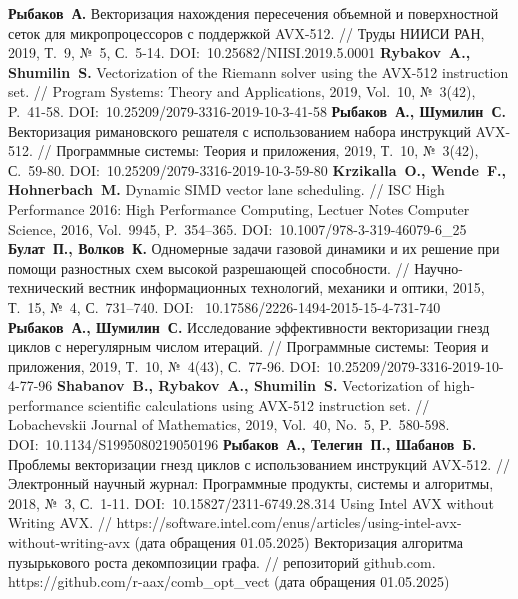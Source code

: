 \begin{thebibliography}{99}
\textbf{Рыбаков~А.} Векторизация нахождения пересечения объемной и поверхностной сеток для микропроцессоров с поддержкой AVX-512. // Труды НИИСИ РАН, 2019, Т.~9, №~5, С.~5-14. DOI:~10.25682/NIISI.2019.5.0001
\textbf{Rybakov~A., Shumilin~S.} Vectorization of the Riemann solver using the AVX-512 instruction set. // Program Systems: Theory and Applications, 2019, Vol.~10, №~3(42), P.~41-58. DOI:~10.25209/2079-3316-2019-10-3-41-58
\textbf{Рыбаков~А., Шумилин~С.} Векторизация римановского решателя с использованием набора инструкций AVX-512. // Программные системы: Теория и приложения, 2019, Т.~10, №~3(42), С.~59-80. DOI:~10.25209/2079-3316-2019-10-3-59-80
\textbf{Krzikalla~O., Wende~F., Hohnerbach~M.} Dynamic SIMD vector lane scheduling. // ISC High Performance 2016: High Performance Computing, Lectuer Notes Computer Science, 2016, Vol.~9945, P.~354–365. DOI:~10.1007/978-3-319-46079-6\_25
\textbf{Булат~П., Волков~К.} Одномерные задачи газовой динамики и их решение при помощи разностных схем высокой разрешающей способности. // Научно-технический вестник информационных технологий, механики и оптики, 2015, Т.~15, №~4, С.~731–740. DOI:~ 10.17586/2226-1494-2015-15-4-731-740
\textbf{Рыбаков~А., Шумилин~С.} Исследование эффективности векторизации гнезд циклов с нерегулярным числом итераций. // Программные системы: Теория и приложения, 2019, Т.~10, №~4(43), С.~77-96. DOI:~10.25209/2079-3316-2019-10-4-77-96
\textbf{Shabanov~B., Rybakov~A., Shumilin~S.} Vectorization of high-performance scientific calculations using AVX-512 instruction set. // Lobachevskii Journal of Mathematics, 2019, Vol.~40, No.~5, P.~580-598. DOI:~10.1134/S1995080219050196
\textbf{Рыбаков~А., Телегин~П., Шабанов~Б.} Проблемы векторизации гнезд циклов с использованием инструкций AVX-512. // Электронный научный журнал: Программные продукты, системы и алгоритмы, 2018, №~3, С.~1-11. DOI:~10.15827/2311-6749.28.314
Using Intel AVX without Writing AVX. // https://software.intel.com/enus/articles/using-intel-avx-without-writing-avx (дата обращения 01.05.2025)
Векторизация алгоритма пузырькового роста декомпозиции графа. // репозиторий github.com. https://github.com/r-aax/comb\_opt\_vect (дата обращения 01.05.2025)


\end{thebibliography}